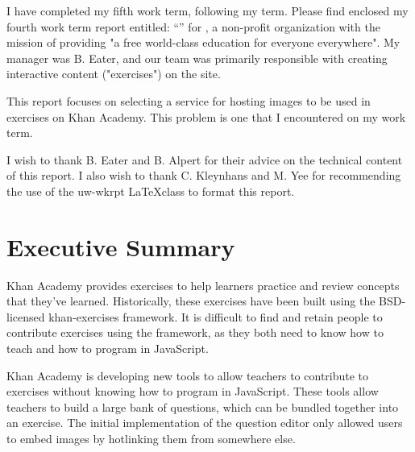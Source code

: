 \documentclass[se]{uw-wkrpt}
\begin{document}
\frontmatter

\begin{letter}
I have completed my fifth work term, following my \theterm{} term. Please find
enclosed my fourth work term report entitled: ``\thetitle'' for \theemployer, a 
non-profit organization with the mission of providing "a free world-class 
education for everyone everywhere". My manager was B. Eater, and our team was 
primarily responsible with creating interactive content ("exercises") on the 
site.

This report focuses on selecting a service for hosting images to be used in 
exercises on Khan Academy. This problem is one that I encountered on my work 
term.

I wish to thank B. Eater and B. Alpert for their advice on the technical 
content of this report. I also wish to thank C. Kleynhans and M. Yee for 
recommending the use of the uw-wkrpt \LaTeX class to format this report.

\end{letter}

\section{Executive Summary}
Khan Academy provides exercises to help learners practice and review concepts 
that they've learned. Historically, these exercises have been built using the 
BSD-licensed khan-exercises framework. It is difficult to find and retain 
people to contribute exercises using the framework, as they both need to know 
how to teach and how to program in JavaScript.

Khan Academy is developing new tools to allow teachers to contribute to 
exercises without knowing how to program in JavaScript. These tools allow 
teachers to build a large bank of questions, which can be bundled together into 
an exercise. The initial implementation of the question editor only allowed 
users to embed images by hotlinking them from somewhere else.
\end{document}
